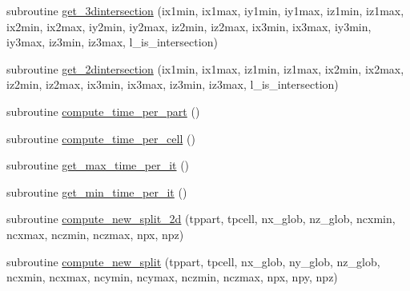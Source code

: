 \begin{DoxyCompactItemize}
\item 
subroutine \hyperlink{namespaceload__balance_a1f27f85178bb29cf23ba30a4fe0dcca4}{get\+\_\+3dintersection} (ix1min, ix1max, iy1min, iy1max, iz1min, iz1max,                                                                                                                   ix2min, ix2max, iy2min, iy2max, iz2min, iz2max,                                                                                                                   ix3min, ix3max, iy3min, iy3max, iz3min, iz3max,                                                                                                                   l\+\_\+is\+\_\+intersection)
\item 
subroutine \hyperlink{namespaceload__balance_a9ba95ccb4742ad1d892ab5ef620c7ab6}{get\+\_\+2dintersection} (ix1min, ix1max, iz1min, iz1max,                                                                                                                   ix2min, ix2max, iz2min, iz2max,                                                                                                                   ix3min, ix3max, iz3min, iz3max,                                                                                                                   l\+\_\+is\+\_\+intersection)
\item 
subroutine \hyperlink{namespaceload__balance_a5c1a9ea3d255e4e91938d5e39c1619c8}{compute\+\_\+time\+\_\+per\+\_\+part} ()
\item 
subroutine \hyperlink{namespaceload__balance_a3372ef5bc3ae8ebdef0d90933fd19319}{compute\+\_\+time\+\_\+per\+\_\+cell} ()
\item 
subroutine \hyperlink{namespaceload__balance_a80526c03cd9a3f83bc80462c7202ed45}{get\+\_\+max\+\_\+time\+\_\+per\+\_\+it} ()
\item 
subroutine \hyperlink{namespaceload__balance_a0103fd1c4bbf143a08380b8784fbeb44}{get\+\_\+min\+\_\+time\+\_\+per\+\_\+it} ()
\item 
subroutine \hyperlink{namespaceload__balance_a18e85039b792c196efea78b39cc3f1d1}{compute\+\_\+new\+\_\+split\+\_\+2d} (tppart, tpcell, nx\+\_\+glob, nz\+\_\+glob,                                       ncxmin, ncxmax, nczmin, nczmax, npx, npz)
\item 
subroutine \hyperlink{namespaceload__balance_aa1f87b6d753beef11f28f62755f25e01}{compute\+\_\+new\+\_\+split} (tppart, tpcell, nx\+\_\+glob, ny\+\_\+glob, nz\+\_\+glob,                                       ncxmin, ncxmax, ncymin, ncymax, nczmin, nczmax, npx, npy, npz)
\item 

\end{DoxyCompactItemize}
